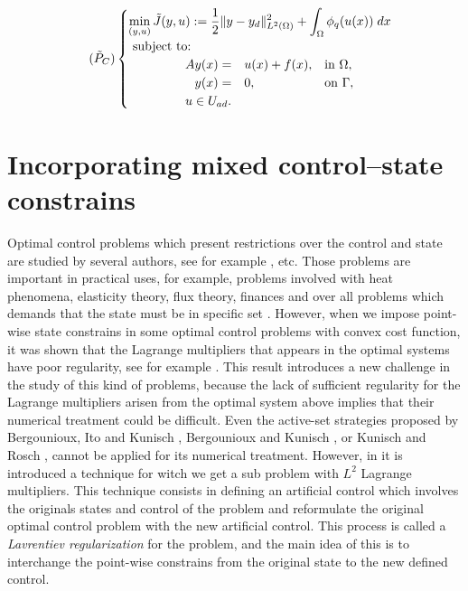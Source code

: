  \begin{equation}
		\tag{$\tilde P_C$} \label{eq:OCP_conv_c}
		\begin{cases}
			\displaystyle\min_{(y,u)} \tilde J(y,u) := \frac12 \lVert y-y_d \rVert^2_{L^2(\Omega)} + \int_\Omega \phi_q (u(x)) \; dx \\
			\hbox{ subject to: }\\
			\hspace{40pt}\begin{array}{rll}
				A y(x) =&u(x) + f(x), &\hbox{in  } \Omega, \\
				y(x)=&0, &\hbox{on  }  \Gamma,
			\end{array}
						\\
						\hspace{45pt} u \in U_{ad}.
		\end{cases}
	\end{equation}

 \section{Incorporating mixed control--state constrains}

 Optimal control problems which present restrictions over the control and state are studied by 
 several authors, see for example \cite{casas, casas1993, casas-mateos2002, casas2008}, etc. 
 Those problems are important in practical uses, for example, problems involved with heat phenomena, 
 elasticity theory, flux theory, finances and over all problems which demands that the state must be 
 in specific set \cite{hintkun}. However, when we impose point-wise state constrains in some 
 optimal control problems with convex cost function, it was shown that the Lagrange multipliers 
 that appears in the optimal systems have poor regularity, see for example 
 \cite{casas, casas2008}. This result introduces a new challenge in the study of this kind 
 of problems, because the lack of sufficient regularity for the Lagrange multipliers arisen from the 
 optimal system above implies that their numerical treatment could be difficult. 
 Even the active-set strategies proposed by Bergounioux, Ito and Kunisch \cite{bik}, Bergounioux and 
 Kunisch \cite{bk}, or Kunisch and Rosch \cite{kr}, cannot be applied for its numerical treatment. 
 However, in \cite{meyer-2007} it is introduced a technique for witch we get a sub problem with $L^2$ 
 Lagrange multipliers. This technique consists in defining an artificial control which involves the 
 originals states and control of the problem and reformulate the original optimal control problem 
 with the new artificial control. This process is called a \textit{Lavrentiev regularization} for 
 the problem, and the main idea of this is to interchange the point-wise constrains from the 
 original state to the new defined control.

